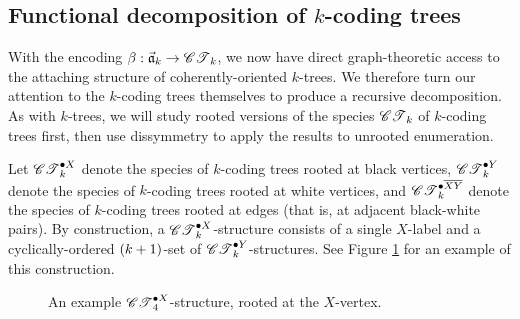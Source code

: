 \documentclass[sectionflow,singlespace,twoside,boldmathhdr,draft]{brandiss} %
\numberwithin{section}{chapter}
\numberwithin{figure}{chapter}
\begin{document}
\subsection{Functional decomposition of $k$-coding trees}\label{ss:codecomp}
With the encoding $\beta: \vec{\mathfrak{a}}_{k} \to \specname{CT}_{k}$, we now have direct graph-theoretic access to the attaching structure of coherently-oriented $k$-trees.
We therefore turn our attention to the $k$-coding trees themselves to produce a recursive decomposition.
As with $k$-trees, we will study rooted versions of the species $\specname{CT}_{k}$ of $k$-coding trees first, then use dissymmetry to apply the results to unrooted enumeration.

Let $\pointed[X]{\specname{CT}}_{k}$ denote the species of $k$-coding trees rooted at black vertices, $\pointed[Y]{\specname{CT}}_{k}$ denote the species of $k$-coding trees rooted at white vertices, and $\pointed[\overline{XY}]{\specname{CT}}_{k}$ denote the species of $k$-coding trees rooted at edges (that is, at adjacent black-white pairs).
By construction, a $\pointed[X]{\specname{CT}}_{k}$-structure consists of a single $X$-label and a cyclically-ordered $\pbrac{k+1}$-set of $\pointed[Y]{\specname{CT}}_{k}$-structures.
See Figure \ref{fig:ctxconst} for an example of this construction.

\begin{figure}[htb]
  \centering
  \def\kval{4}
  \caption[An example $X$-rooted $k$-coding tree]{An example $\pointed[X]{\specname{CT}}_{\kval}$-structure, rooted at the $X$-vertex.}
  \label{fig:ctxconst}
\end{figure}
\end{document}
